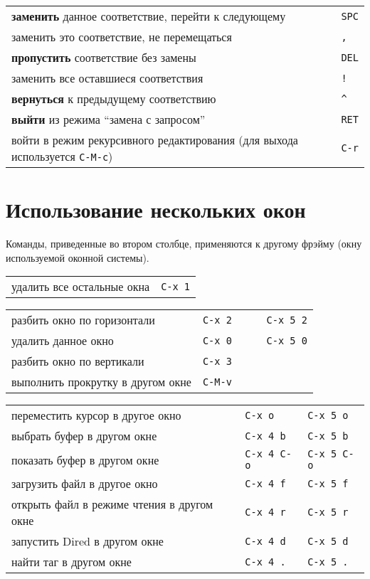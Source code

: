 \documentclass[10pt]{article}
\newlength{\ColWidth}
\newlength{\ColThreeWidth}
\newcommand{\kbd}[1]{\texttt{#1}}
\begin{document}
\begin{tabular}{p{\ColWidth}l}
{\bf заменить} данное соответствие, перейти к следующему & \kbd{SPC} \\
заменить это соответствие, не перемещаться & \kbd{,} \\
{\bf пропустить} соответствие без замены & \kbd{DEL} \\
заменить все оставшиеся соответствия & \kbd{!} \\
{\bf вернуться} к предыдущему соответствию & \kbd{\^} \\
{\bf выйти} из режима ``замена с запросом'' & \kbd{RET} \\
войти в режим рекурсивного редактирования (для выхода используется \kbd{C-M-c}) & \kbd{C-r} \\
\end{tabular}

\section{Использование нескольких окон}

Команды, приведенные во втором столбце, применяются к другому
фрэйму (окну используемой оконной системы).

\begin{tabular}{p{\ColWidth}l}
удалить все остальные окна & \kbd{C-x 1} \\
\end{tabular}

\begin{tabular}{p{\ColWidth}p{\ColThreeWidth}p{\ColThreeWidth}}
разбить окно по горизонтали & \kbd{C-x 2\ \ \ \ } & \kbd{C-x 5 2} \\
удалить данное окно & \kbd{C-x 0\ \ \ \ } & \kbd{C-x 5 0} \\

разбить окно по вертикали & \kbd{C-x 3} \\

выполнить прокрутку в другом окне & \kbd{C-M-v} \\
\end{tabular}

\begin{tabular}{p{\ColWidth}p{\ColThreeWidth}p{\ColThreeWidth}}
переместить курсор в другое окно & \kbd{C-x o} & \kbd{C-x 5 o} \\

выбрать буфер в другом окне & \kbd{C-x 4 b} & \kbd{C-x 5 b} \\
показать буфер в другом окне & \kbd{C-x 4 C-o} & \kbd{C-x 5 C-o} \\
загрузить файл в другое окно & \kbd{C-x 4 f} & \kbd{C-x 5 f} \\
открыть файл в режиме чтения в другом окне & \kbd{C-x 4 r} & \kbd{C-x 5 r} \\
запустить Dired в другом окне & \kbd{C-x 4 d} & \kbd{C-x 5 d} \\
найти таг в другом окне & \kbd{C-x 4 .} & \kbd{C-x 5 .} \\

\end{tabular}
\end{document}
